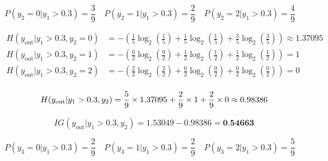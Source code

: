 \documentclass[12pt]{article}
\begin{document}
\begin{enumerate}[leftmargin=\labelsep]
\vspace{0.5cm}
\quad{}

\begin{equation*}
    P(y_2 = 0 | y_1 > 0.3) = \frac{3}{9} \quad
    P(y_2 = 1 | y_1 > 0.3) = \frac{2}{9} \quad
    P(y_2 = 2 | y_1 > 0.3) = \frac{4}{9} \quad
\end{equation*}

\begin{equation*}
    \begin{aligned}
        H(y_{\text{out}} | y_1 > 0.3, y_2 = 0) &= - \left( \frac{1}{5} \log_2 \left( \frac{1}{5} \right) + \frac{1}{5} \log_2 \left( \frac{1}{5} \right) + \frac{3}{5} \log_2 \left( \frac{3}{5} \right) \right) \approx 1.37095
        \\
        H(y_{\text{out}} | y_1 > 0.3, y_2 = 1) &= - \left( \frac{0}{2} \log_2 \left( \frac{0}{2} \right) + \frac{1}{2} \log_2 \left( \frac{1}{2} \right) + \frac{1}{2} \log_2 \left( \frac{1}{2} \right) \right) = 1
        \\
        H(y_{\text{out}} | y_1 > 0.3, y_2 = 2) &= - \left( \frac{2}{2} \log_2 \left( \frac{2}{2} \right) + \frac{0}{2} \log_2 \left( \frac{0}{2} \right) + \frac{0}{2} \log_2 \left( \frac{0}{2} \right) \right) = 0
        \\
    \end{aligned}
\end{equation*}

\begin{equation*}
    H(y_{\text{out}} | y_1 > 0.3, y_2) = \frac{5}{9} \times  1.37095 + \frac{2}{9} \times 1 + \frac{2}{9} \times 0 \approx 0.98386
    \\
\end{equation*}

\begin{equation*}
    IG(y_{\text{out}} | y_1 > 0.3, y_2) = 1.53049 - 0.98386 = \textbf{0.54663}
\end{equation*}

\newpage


\begin{equation*}
    P(y_3 = 0|y_1 > 0.3) = \frac{2}{9} \quad
    P(y_3 = 1|y_1 > 0.3) = \frac{2}{9} \quad
    P(y_3 = 2|y_1 > 0.3) = \frac{5}{9} \quad
\end{equation*}


\end{enumerate}
\end{document}
